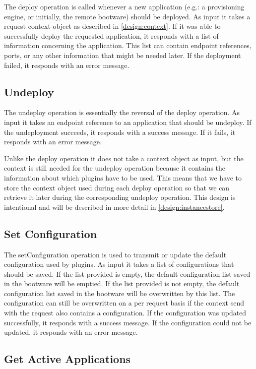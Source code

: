 The deploy operation is called whenever a new application (e.g.: a provisioning engine, or initially, the remote bootware) should be deployed.
As input it takes a request context object as described in \autoref{design:context}.
If it was able to successfully deploy the requested application, it responds with a list of information concerning the application.
This list can contain endpoint references, ports, or any other information that might be needed later.
If the deployment failed, it responds with an error message.

\subsection{Undeploy}

The undeploy operation is essentially the reversal of the deploy operation.
As input it takes an endpoint reference to an application that should be undeploy.
If the undeployment succeeds, it responds with a success message.
If it fails, it responds with an error message.

Unlike the deploy operation it does not take a context object as input, but the context is still needed for the undeploy operation because it contains the information about which plugins have to be used.
This means that we have to store the context object used during each deploy operation so that we can retrieve it later during the corresponding undeploy operation.
This design is intentional and will be described in more detail in \autoref{design:instancestore}.

\subsection{Set Configuration}

The setConfiguration operation is used to transmit or update the default configuration used by plugins.
As input it takes a list of configurations that should be saved.
If the list provided is empty, the default configuration list saved in the bootware will be emptied.
If the list provided is not empty, the default configuration list saved in the bootware will be overwritten by this list.
The configuration can still be overwritten on a per request basis if the context send with the request also contains a configuration.
If the configuration was updated successfully, it responds with a success message.
If the configuration could not be updated, it responds with an error message.

\subsection{Get Active Applications}

